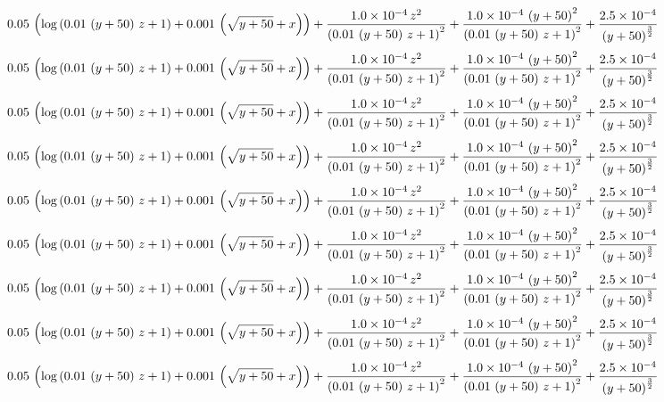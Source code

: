 $$0.05\,\left(\log \left(0.01\,\left(y+50\right)\,z+1\right)+0.001\,
 \left(\sqrt{y+50}+x\right)\right)+{{1.0 \times 10^{-4}\,z^2}\over{
 \left(0.01\,\left(y+50\right)\,z+1\right)^2}}+{{1.0 \times 10^{-4}\,
 \left(y+50\right)^2}\over{\left(0.01\,\left(y+50\right)\,z+1\right)^
 2}}+{{2.5 \times 10^{-4}}\over{\left(y+50\right)^{{{3}\over{2}}}}}$$
$$0.05\,\left(\log \left(0.01\,\left(y+50\right)\,z+1\right)+0.001\,
 \left(\sqrt{y+50}+x\right)\right)+{{1.0 \times 10^{-4}\,z^2}\over{
 \left(0.01\,\left(y+50\right)\,z+1\right)^2}}+{{1.0 \times 10^{-4}\,
 \left(y+50\right)^2}\over{\left(0.01\,\left(y+50\right)\,z+1\right)^
 2}}+{{2.5 \times 10^{-4}}\over{\left(y+50\right)^{{{3}\over{2}}}}}$$
$$0.05\,\left(\log \left(0.01\,\left(y+50\right)\,z+1\right)+0.001\,
 \left(\sqrt{y+50}+x\right)\right)+{{1.0 \times 10^{-4}\,z^2}\over{
 \left(0.01\,\left(y+50\right)\,z+1\right)^2}}+{{1.0 \times 10^{-4}\,
 \left(y+50\right)^2}\over{\left(0.01\,\left(y+50\right)\,z+1\right)^
 2}}+{{2.5 \times 10^{-4}}\over{\left(y+50\right)^{{{3}\over{2}}}}}$$
$$0.05\,\left(\log \left(0.01\,\left(y+50\right)\,z+1\right)+0.001\,
 \left(\sqrt{y+50}+x\right)\right)+{{1.0 \times 10^{-4}\,z^2}\over{
 \left(0.01\,\left(y+50\right)\,z+1\right)^2}}+{{1.0 \times 10^{-4}\,
 \left(y+50\right)^2}\over{\left(0.01\,\left(y+50\right)\,z+1\right)^
 2}}+{{2.5 \times 10^{-4}}\over{\left(y+50\right)^{{{3}\over{2}}}}}$$
$$0.05\,\left(\log \left(0.01\,\left(y+50\right)\,z+1\right)+0.001\,
 \left(\sqrt{y+50}+x\right)\right)+{{1.0 \times 10^{-4}\,z^2}\over{
 \left(0.01\,\left(y+50\right)\,z+1\right)^2}}+{{1.0 \times 10^{-4}\,
 \left(y+50\right)^2}\over{\left(0.01\,\left(y+50\right)\,z+1\right)^
 2}}+{{2.5 \times 10^{-4}}\over{\left(y+50\right)^{{{3}\over{2}}}}}$$
$$0.05\,\left(\log \left(0.01\,\left(y+50\right)\,z+1\right)+0.001\,
 \left(\sqrt{y+50}+x\right)\right)+{{1.0 \times 10^{-4}\,z^2}\over{
 \left(0.01\,\left(y+50\right)\,z+1\right)^2}}+{{1.0 \times 10^{-4}\,
 \left(y+50\right)^2}\over{\left(0.01\,\left(y+50\right)\,z+1\right)^
 2}}+{{2.5 \times 10^{-4}}\over{\left(y+50\right)^{{{3}\over{2}}}}}$$
$$0.05\,\left(\log \left(0.01\,\left(y+50\right)\,z+1\right)+0.001\,
 \left(\sqrt{y+50}+x\right)\right)+{{1.0 \times 10^{-4}\,z^2}\over{
 \left(0.01\,\left(y+50\right)\,z+1\right)^2}}+{{1.0 \times 10^{-4}\,
 \left(y+50\right)^2}\over{\left(0.01\,\left(y+50\right)\,z+1\right)^
 2}}+{{2.5 \times 10^{-4}}\over{\left(y+50\right)^{{{3}\over{2}}}}}$$
$$0.05\,\left(\log \left(0.01\,\left(y+50\right)\,z+1\right)+0.001\,
 \left(\sqrt{y+50}+x\right)\right)+{{1.0 \times 10^{-4}\,z^2}\over{
 \left(0.01\,\left(y+50\right)\,z+1\right)^2}}+{{1.0 \times 10^{-4}\,
 \left(y+50\right)^2}\over{\left(0.01\,\left(y+50\right)\,z+1\right)^
 2}}+{{2.5 \times 10^{-4}}\over{\left(y+50\right)^{{{3}\over{2}}}}}$$
$$0.05\,\left(\log \left(0.01\,\left(y+50\right)\,z+1\right)+0.001\,
 \left(\sqrt{y+50}+x\right)\right)+{{1.0 \times 10^{-4}\,z^2}\over{
 \left(0.01\,\left(y+50\right)\,z+1\right)^2}}+{{1.0 \times 10^{-4}\,
 \left(y+50\right)^2}\over{\left(0.01\,\left(y+50\right)\,z+1\right)^
 2}}+{{2.5 \times 10^{-4}}\over{\left(y+50\right)^{{{3}\over{2}}}}}$$
